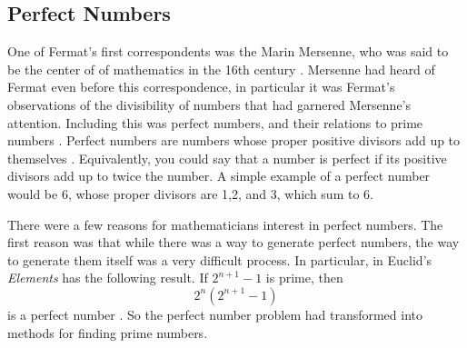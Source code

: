 \documentclass[11pt]{article}
\begin{document}
\subsection*{Perfect Numbers}
One of Fermat's first correspondents was the Marin Mersenne, who was said to be
the center of of mathematics in the 16th century \cite{Mersenne}.
Mersenne had heard of Fermat even before this correspondence, in particular it
was Fermat's observations of the divisibility of numbers that had garnered 
Mersenne's attention.
Including this was perfect numbers, and their relations to prime
numbers \cite{Mahoney}.
Perfect numbers are numbers whose proper positive divisors add up to
themselves \cite{PerfectNumbers}.
Equivalently, you could say that a number is perfect if its positive divisors
add up to twice the number.
A simple example of a perfect number would be 6, whose proper divisors are
1,2, and 3, which sum to 6.

There were a few reasons for mathematicians interest in perfect numbers.
The first reason was that while there was a way to generate perfect numbers,
the way to generate them itself was a very difficult process.
In particular, in Euclid's \emph{Elements} has the following result.
If $2^{n+1} - 1$ is prime, then \[ 2^n(2^{n+1} - 1)\]
is a perfect number \cite{Euclid,Mahoney}.
So the perfect number problem had transformed into methods for
finding prime numbers.
\end{document}
